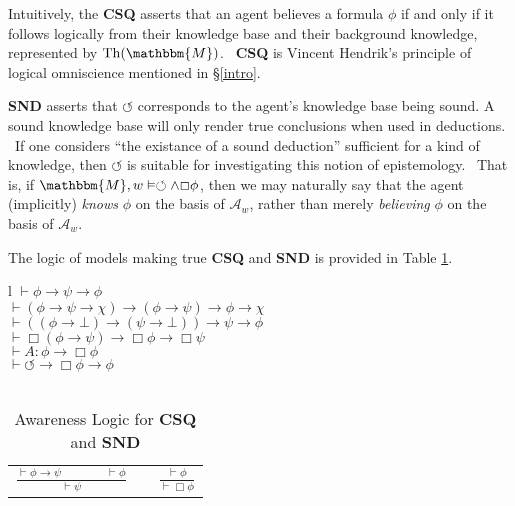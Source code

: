 \documentclass{acmconf}
\newcommand{\tmem}[1]{{\em #1\/}}
\newcommand{\tmop}[1]{\ensuremath{\operatorname{#1}}}
\newcommand{\tmtextbf}[1]{{\bfseries{#1}}}
\begin{document}
Intuitively, the \tmtextbf{CSQ} asserts that an agent believes a formula
$\phi$ if and only if it follows logically from their knowledge base and their
background knowledge, represented by $\tmop{Th} (\mathbbm{M})$. \
\tmtextbf{CSQ} is Vincent Hendrik's principle of logical omniscience mentioned
in {\S}\ref{intro}.



\tmtextbf{SND} asserts that $\circlearrowleft$ corresponds to the agent's
knowledge base being sound. A sound knowledge base will only render true
conclusions when used in deductions. \ If one considers ``the existance of a
sound deduction'' sufficient for a kind of knowledge, then $\circlearrowleft$
is suitable for investigating this notion of epistemology. \ That is, if
$\mathbbm{M}, w \vDash \circlearrowleft \wedge \Box \phi$, then we may
naturally say that the agent (implicitly) {\tmem{knows}} $\phi$ on the basis
of $\mathcal{A}_w$, rather than merely {\tmem{believing}} $\phi$ on the basis
of $\mathcal{A}_w$.



The logic of models making true \tmtextbf{CSQ} and \tmtextbf{SND} is provided
in Table \ref{logic1}.

\begin{table}[h]
  \begin{tabular}{l}
    $\vdash \phi \rightarrow \psi \rightarrow \phi$\\
    $\vdash (\phi \rightarrow \psi \rightarrow \chi) \rightarrow (\phi
    \rightarrow \psi) \rightarrow \phi \rightarrow \chi$\\
    $\vdash ((\phi \rightarrow \bot) \rightarrow (\psi \rightarrow \bot))
    \rightarrow \psi \rightarrow \phi$\\
    $\vdash \Box(\phi \rightarrow \psi) \rightarrow \Box \phi \rightarrow \Box
    \psi$\\
    $\vdash A : \phi \rightarrow \Box \phi$\\
    $\vdash \circlearrowleft \rightarrow \Box \phi \rightarrow \phi$\\
    \\
    \begin{tabular}{lll}
      $\frac{\vdash \phi \rightarrow \psi \hspace{4em} \vdash \phi}{\vdash
      \psi}$ & {\hspace{6em}} & $\frac{\vdash \phi}{\vdash \Box \phi}$
    \end{tabular}
  \end{tabular}
  \caption{\label{logic1}Awareness Logic for \tmtextbf{CSQ} and
  \tmtextbf{SND}}
\end{table}
\end{document}
